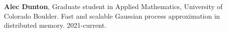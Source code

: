 \item \textbf{Alec Dunton},
      Graduate student in Applied Mathematics,
      University of Colorado Boulder.
      Fast and scalable Gaussian process approximation in distributed memory.
      2021-current.
